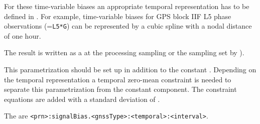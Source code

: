 For these time-variable biases an appropriate temporal representation has to be defined in
.
For example, time-variable biases for GPS block IIF L5 phase observations (=\verb|L5*G|)
can be represented by a cubic spline with a nodal distance of one hour.

The result is written as a  at the processing sampling
or the sampling set by ).

This parametrization should be set up in addition to the constant
.
Depending on the temporal representation a temporal zero-mean constraint is needed
to separate this parametrization from the constant component. The constraint equations are added with
a standard deviation of .

The  are
\verb|<prn>:signalBias.<gnssType>:<temporal>:<interval>|.


